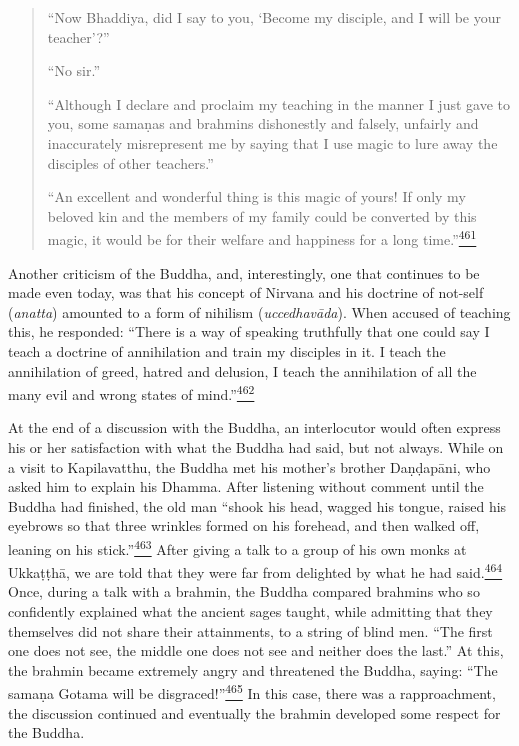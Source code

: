 \begin{quote}
``Now Bhaddiya, did I say to you, `Become my disciple, and I will be
your teacher'?''

``No sir.''

``Although I declare and proclaim my teaching in the manner I just gave
to you, some samaṇas and brahmins dishonestly and falsely, unfairly and
inaccurately misrepresent me by saying that I use magic to lure away the
disciples of other teachers.''

``An excellent and wonderful thing is this magic of yours! If only my
beloved kin and the members of my family could be converted by this
magic, it would be for their welfare and happiness for a long
time.''\label{footprints_split_013.html_fnref461}\hyperref[footprints_split_025.htmlux5cux23fn461]{\textsuperscript{461}}
\end{quote}

Another criticism of the Buddha, and, interestingly, one that continues
to be made even today, was that his concept of Nirvana and his doctrine
of not-self (\emph{anatta}) amounted to a form of nihilism
(\emph{uccedhavāda}). When accused of teaching this, he responded:
``There is a way of speaking truthfully that one could say I teach a
doctrine of annihilation and train my disciples in it. I teach the
annihilation of greed, hatred and delusion, I teach the annihilation of
all the many evil and wrong states of
mind.''\label{footprints_split_013.html_fnref462}\hyperref[footprints_split_025.htmlux5cux23fn462]{\textsuperscript{462}}

At the end of a discussion with the Buddha, an interlocutor would often
express his or her satisfaction with what the Buddha had said, but not
always. While on a visit to Kapilavatthu, the Buddha met his mother's
brother Daṇḍapāni, who asked him to explain his Dhamma. After listening
without comment until the Buddha had finished, the old man ``shook his
head, wagged his tongue, raised his eyebrows so that three wrinkles
formed on his forehead, and then walked off, leaning on his
stick.''\label{footprints_split_013.html_fnref463}\hyperref[footprints_split_025.htmlux5cux23fn463]{\textsuperscript{463}}
After giving a talk to a group of his own monks at Ukkaṭṭhā, we are told
that they were far from delighted by what he had
said.\label{footprints_split_013.html_fnref464}\hyperref[footprints_split_025.htmlux5cux23fn464]{\textsuperscript{464}}
Once, during a talk with a brahmin, the Buddha compared brahmins who so
confidently explained what the ancient sages taught, while admitting
that they themselves did not share their attainments, to a string of
blind men. ``The first one does not see, the middle one does not see and
neither does the last.'' At this, the brahmin became extremely angry and
threatened the Buddha, saying: ``The samaṇa Gotama will be
disgraced!''\label{footprints_split_013.html_fnref465}\hyperref[footprints_split_025.htmlux5cux23fn465]{\textsuperscript{465}}
In this case, there was a rapproachment, the discussion continued and
eventually the brahmin developed some respect for the Buddha.

